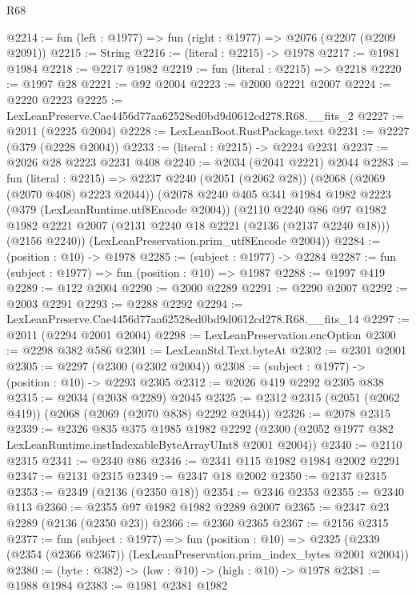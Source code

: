 \begin{lexlean}{R68}
\begin{coremodule}
@2214 := fun (left : @1977) => fun (right : @1977) => @2076 (@2207 (@2209 @2091))
@2215 := String
@2216 := (literal : @2215) -> @1978
@2217 := @1981 @1984
@2218 := @2217 @1982
@2219 := fun (literal : @2215) => @2218
@2220 := @1997 @28
@2221 := @92 @2004
@2223 := @2000 @2221 @2007
@2224 := @2220 @2223
@2225 := LexLeanPreserve.Cae4456d77aa62528ed0bd9d0612cd278.R68.__fits_2
@2227 := @2011 (@2225 @2004)
@2228 := LexLeanBoot.RustPackage.text
@2231 := @2227 (@379 (@2228 @2004))
@2233 := (literal : @2215) -> @2224 @2231
@2237 := @2026 @28 @2223 @2231 @408
@2240 := @2034 (@2041 @2221) @2044
@2283 := fun (literal : @2215) =>
  @2237
    @2240
    (@2051 (@2062 @28))
    (@2068 (@2069 (@2070 @408) @2223 @2044))
    (@2078
      @2240
      @405
      @341
      @1984
      @1982
      @2223
      (@379 (LexLeanRuntime.utf8Encode @2004))
      (@2110
        @2240
        @86
        @97
        @1982
        @1982
        @2221
        @2007
        (@2131 @2240 @18 @2221 (@2136 (@2137 @2240 @18)))
        (@2156 @2240))
      (LexLeanPreservation.prim_utf8Encode @2004))
@2284 := (position : @10) -> @1978
@2285 := (subject : @1977) -> @2284
@2287 := fun (subject : @1977) => fun (position : @10) => @1987
@2288 := @1997 @419
@2289 := @122 @2004
@2290 := @2000 @2289
@2291 := @2290 @2007
@2292 := @2003 @2291
@2293 := @2288 @2292
@2294 := LexLeanPreserve.Cae4456d77aa62528ed0bd9d0612cd278.R68.__fits_14
@2297 := @2011 (@2294 @2001 @2004)
@2298 := LexLeanPreservation.encOption
@2300 := @2298 @382 @586
@2301 := LexLeanStd.Text.byteAt
@2302 := @2301 @2001
@2305 := @2297 (@2300 (@2302 @2004))
@2308 := (subject : @1977) -> (position : @10) -> @2293 @2305
@2312 := @2026 @419 @2292 @2305 @838
@2315 := @2034 (@2038 @2289) @2045
@2325 := @2312 @2315 (@2051 (@2062 @419)) (@2068 (@2069 (@2070 @838) @2292 @2044))
@2326 := @2078 @2315
@2339 := @2326
    @835
    @375
    @1985
    @1982
    @2292
    (@2300 (@2052 @1977 @382 LexLeanRuntime.instIndexableByteArrayUInt8 @2001 @2004))
@2340 := @2110 @2315
@2341 := @2340 @86
@2346 := @2341 @115 @1982 @1984 @2002 @2291
@2347 := @2131 @2315
@2349 := @2347 @18 @2002
@2350 := @2137 @2315
@2353 := @2349 (@2136 (@2350 @18))
@2354 := @2346 @2353
@2355 := @2340 @113
@2360 := @2355 @97 @1982 @1982 @2289 @2007
@2365 := @2347 @23 @2289 (@2136 (@2350 @23))
@2366 := @2360 @2365
@2367 := @2156 @2315
@2377 := fun (subject : @1977) =>
  fun (position : @10) =>
  @2325 (@2339 (@2354 (@2366 @2367)) (LexLeanPreservation.prim_index_bytes @2001 @2004))
@2380 := (byte : @382) -> (low : @10) -> (high : @10) -> @1978
@2381 := @1988 @1984
@2383 := @1981 @2381 @1982

\end{coremodule}
\end{lexlean}
